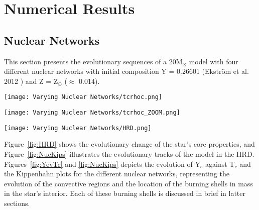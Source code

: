\section{Numerical Results}
\subsection{Nuclear Networks}

This section presents the evolutionary sequences of a 20M\(_\odot \) model with four different nuclear networks with initial composition Y = 0.26601 (Ekström et al. 2012 ) and Z = Z\(_\odot \) ($\approx$  0.014).

\vspace{1em}

\noindent
\begin{minipage}{0.5\textwidth}
    \centering
    \texttt{[image: Varying Nuclear Networks/tcrhoc.png]}
    \label{fig:tcrhoc}
\end{minipage}
\hfill
\begin{minipage}{0.5\textwidth}
    \centering
    \texttt{[image: Varying Nuclear Networks/tcrhoc\_ZOOM.png]}
    \label{fig:tcrhoczoom}
\end{minipage}

\vspace{1em}
\begin{center}
    \texttt{[image: Varying Nuclear Networks/HRD.png]}
\end{center}
\label{fig:HRD}

\vspace{1em}
\noindent
Figure~\ref{fig:HRD} shows the evolutionary change of the star’s core properties, and Figure~\ref{fig:NucKips} illustrates the evolutionary tracks of the model in the HRD. Figures~\ref{fig:YevTc} and \ref{fig:NucKips} depicts the evolution of Y$_e$ against T$_c$ and the Kippenhahn plots for the different nuclear networks, representing the evolution of the convective regions and the location of the burning shells in mass in the star's interior. Each of these burning shells is discussed in brief in latter sections.

